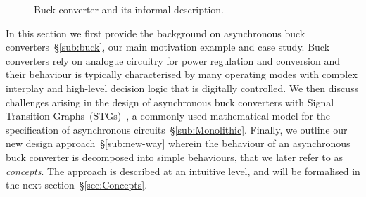 \documentclass[british,compsoc]{IEEEtran}
\begin{document}
\begin{figure}[t]
\begin{centering}
\par
{}
\par
\end{centering}
\protect\caption{\label{fig:buck}Buck converter and its informal description.}
\end{figure}

In this section we first provide the background on asynchronous buck
converters~\S\ref{sub:buck}, our main motivation example and case study.
Buck converters rely on analogue circuitry for power regulation and
conversion and their behaviour is typically characterised by many operating
modes with complex interplay and high-level decision logic that is digitally
controlled.
We then discuss challenges arising in the design of asynchronous buck converters
with Signal Transition Graphs~(STGs)~\cite{Chu_1987_phd}\cite{Rosenblum_1985_tpn},
a commonly used mathematical model for the specification of asynchronous
circuits~\S\ref{sub:Monolithic}.
Finally, we outline our new design approach~\S\ref{sub:new-way} wherein the
behaviour of an asynchronous buck converter is decomposed into simple
behaviours, that we later refer to as \emph{concepts}. The approach is
described at an intuitive level, and will be formalised in the next
section~\S\ref{sec:Concepts}.
\end{document}
